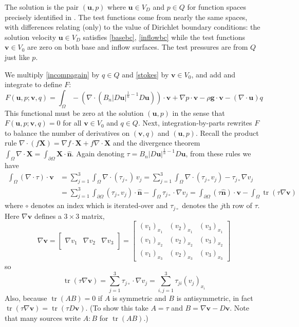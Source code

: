 \documentclass[letterpaper,final,12pt,reqno]{amsart}
\newcommand{\grad}{\nabla}
\newcommand{\trace}{\operatorname{tr}}
\newcommand{\hbn}{\hat{\mathbf{n}}}
\newcommand{\bu}{\mathbf{u}}
\newcommand{\bv}{\mathbf{v}}
\newcommand{\bX}{\mathbf{X}}
\begin{document}
The solution is the pair $(\bu,p)$ where $\bu\in V_D$ and $p \in Q$ for function spaces precisely identified in \cite{JouvetRappaz2011}.  The test functions come from nearly the same spaces, with differences relating (only) to the value of Dirichlet boundary conditions: the solution velocity $\bu\in V_D$ satisfies \eqref{basebc}, \eqref{inflowbc} while the test functions $\bv\in V_0$ are zero on both base and inflow surfaces.  The test pressures are from $Q$ just like $p$.

We multiply \eqref{incompagain} by $q\in Q$ and \eqref{stokes} by $\bv\in V_0$, and add and integrate to define $F$:
\begin{equation}
F(\bu,p;\bv,q) = \int_\Omega - \left(\nabla \cdot \left(B_n |D\bu|^{\frac{1}{n} - 1} D\bu\right)\right)\cdot \bv + \nabla p \cdot \bv - \rho \mathbf{g} \cdot \bv - \left(\nabla \cdot \bu\right) q \label{nonfuncone}
\end{equation}
This functional must be zero at the solution $(\bu,p)$ in the sense that $F(\bu,p;\bv,q) = 0$ for all  $\bv\in V_0$ and $q\in Q$.  Next, integration-by-parts rewrites $F$ to balance the number of derivatives on $(\bv,q)$ and $(\bu,p)$.  Recall the product rule $\nabla \cdot(f\bX) = \grad f\cdot \bX + f \nabla \cdot \bX$ and the divergence theorem $\int_\Omega \nabla \cdot \bX = \int_{\partial \Omega} \bX \cdot \hbn$.  Again denoting $\tau = B_n |D\bu|^{\frac{1}{n} - 1} D\bu$, from these rules we have
\begin{align*}
\int_\Omega \left(\nabla \cdot \tau\right)\cdot \bv &= \sum_{j=1}^3 \int_\Omega \nabla \cdot (\tau_{j\circ})\, v_j = \sum_{j=1}^3 \int_\Omega \nabla \cdot (\tau_{j\circ} v_j) - \tau_{j\circ} \nabla v_j \\
  &= \sum_{j=1}^3 \int_{\partial \Omega} (\tau_{j\circ} v_j) \cdot \hbn - \int_\Omega \tau_{j\circ} \cdot \nabla v_j = \int_{\partial \Omega} (\tau \hbn)\cdot \bv - \int_\Omega \trace(\tau \nabla \bv)
\end{align*}
where $\circ$ denotes an index which is iterated-over and $\tau_{j\circ}$ denotes the $j$th row of $\tau$.  Here $\grad\bv$ defines a $3\times 3$ matrix,
\newcommand{\trefthree}[3]{\left[\begin{array}{c|c|c} & & \\ #1 & #2 & #3 \\ & & \end{array}\right]}
    $$\grad \bv = \trefthree{\grad v_1}{\grad v_2}{\grad v_3} = \begin{bmatrix}
    (v_1)_{x_1} & (v_2)_{x_1} & (v_3)_{x_1} \\
    (v_1)_{x_2} & (v_2)_{x_2} & (v_3)_{x_2} \\
    (v_1)_{x_3} & (v_2)_{x_3} & (v_3)_{x_3}
    \end{bmatrix}$$
so
    $$\trace(\tau \grad \bv) = \sum_{j=1}^3 \tau_{j\circ} \cdot \grad v_j = \sum_{i,j=1}^3 \tau_{ji} (v_j)_{x_i}$$
Also, because $\trace(AB)=0$ if $A$ is symmetric and $B$ is antisymmetric, in fact $\trace(\tau \grad \bv) = \trace(\tau D\bv)$.  (To show this take $A=\tau$ and $B=\grad\bv-D\bv$.  Note that many sources write $A:B$ for $\trace(AB)$.)
\end{document}
